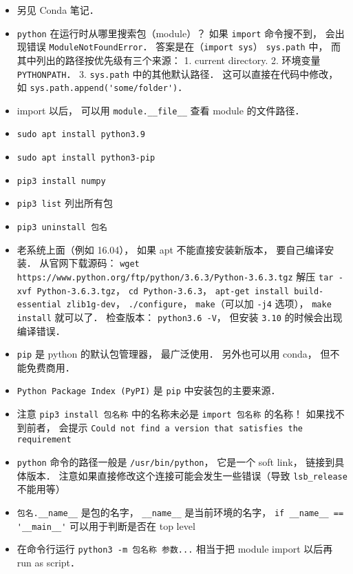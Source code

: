 

\begin{itemize}
\item 另见 Conda 笔记．
\item \verb|python| 在运行时从哪里搜索包（module）？ 如果 \verb|import| 命令搜不到， 会出现错误 \verb|ModuleNotFoundError|． 答案是在（\verb|import sys|） \verb|sys.path| 中， 而其中列出的路径按优先级有三个来源： 1. current directory. 2. 环境变量 \verb|PYTHONPATH|． 3. \verb|sys.path| 中的其他默认路径． 这可以直接在代码中修改， 如 \verb|sys.path.append('some/folder')|．
\item import 以后， 可以用 \verb|module.__file__| 查看 module 的文件路径．
\item \verb|sudo apt install python3.9|
\item \verb|sudo apt install python3-pip|
\item \verb|pip3 install numpy|
\item \verb|pip3 list| 列出所有包
\item \verb|pip3 uninstall 包名|
\item 老系统上面（例如 16.04）， 如果 apt 不能直接安装新版本， 要自己编译安装． 从官网下载源码： \verb|wget https://www.python.org/ftp/python/3.6.3/Python-3.6.3.tgz| 解压 \verb|tar -xvf Python-3.6.3.tgz|， \verb|cd Python-3.6.3|， \verb|apt-get install build-essential zlib1g-dev|， \verb|./configure|， \verb|make|（可以加 \verb|-j4| 选项）， \verb|make install| 就可以了． 检查版本： \verb|python3.6 -V|， 但安装 \verb|3.10| 的时候会出现编译错误．
\item \verb|pip| 是 python 的默认包管理器， 最广泛使用． 另外也可以用 conda， 但不能免费商用．
\item \verb|Python Package Index (PyPI)| 是 \verb|pip| 中安装包的主要来源．
\item 注意 \verb|pip3 install 包名称| 中的名称未必是 \verb|import 包名称| 的名称！ 如果找不到前者， 会提示 \verb|Could not find a version that satisfies the requirement|
\item \verb|python| 命令的路径一般是 \verb|/usr/bin/python|， 它是一个 soft link， 链接到具体版本． 注意如果直接修改这个连接可能会发生一些错误（导致 \verb|lsb_release| 不能用等）
\item \verb|包名.__name__| 是包的名字， \verb|__name__| 是当前环境的名字， \verb|if __name__ == '__main__'| 可以用于判断是否在 top level
\item 在命令行运行 \verb|python3 -m 包名称 参数...| 相当于把 module import 以后再 run as script．
\end{itemize}
